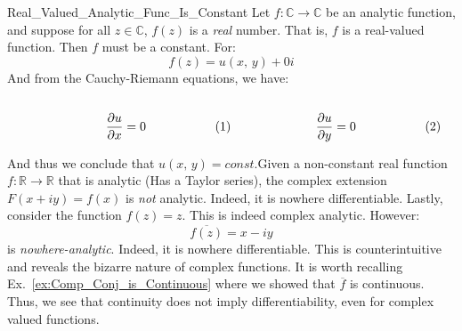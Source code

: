     \begin{lexample}{}{Real_Valued_Analytic_Func_Is_Constant}
        Let $f:\mathbb{C}\rightarrow\mathbb{C}$ be an analytic function,
        and suppose for all $z\in\mathbb{C}$, $f(z)$ is a \textit{real}
        number. That is, $f$ is a real-valued function. Then $f$
        must be a constant. For:
        \begin{equation}
            f(z)=u(x,\,y)+0i
        \end{equation}
        And from the Cauchy-Riemann equations, we have:
        \par
        \begin{subequations}
            \begin{minipage}[b]{0.49\textwidth}
                \centering
                \begin{equation}
                    \frac{\partial{u}}{\partial{x}}=0
                \end{equation}
            \end{minipage}
            \hfill
            \begin{minipage}[b]{0.49\textwidth}
                \centering
                \begin{equation}
                    \frac{\partial{u}}{\partial{y}}=0
                \end{equation}
            \end{minipage}
        \end{subequations}
        \par\hfill\par
        And thus we conclude that $u(x,\,y)=const$.Given a non-constant
        real function $f:\mathbb{R}\rightarrow\mathbb{R}$ that is
        analytic (Has a Taylor series), the complex extension
        $F(x+iy)=f(x)$ is \textit{not} analytic. Indeed, it is nowhere
        differentiable. Lastly, consider the function $f(z)=z$. This
        is indeed complex analytic. However:
        \begin{equation}
            \overline{f(z)}=x-iy
        \end{equation}
        is \textit{nowhere-analytic}. Indeed, it is nowhere
        differentiable. This is counterintuitive and reveals the bizarre
        nature of complex functions. It is worth recalling
        Ex.~\ref{ex:Comp_Conj_is_Continuous} where we showed that
        $\overline{f}$ is continuous. Thus, we see that continuity
        does not imply differentiability, even for complex valued
        functions.
    \end{lexample}
